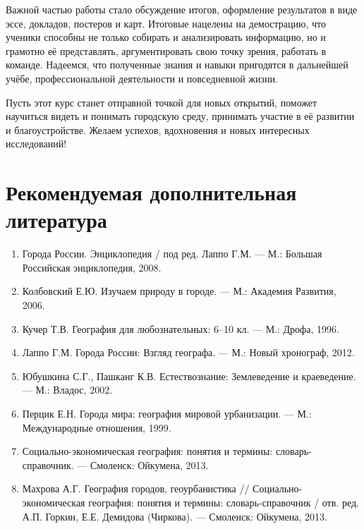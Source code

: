 \documentclass[
  11pt,
]{book}
\providecommand{\tightlist}{%
  \setlength{\itemsep}{0pt}\setlength{\parskip}{0pt}}
\begin{document}
Важной частью работы стало обсуждение итогов, оформление результатов в виде эссе, докладов, постеров и карт. Итоговые нацелены на демострацию, что ученики способны не только собирать и анализировать информацию, но и грамотно её представлять, аргументировать свою точку зрения, работать в команде. Надеемся, что полученные знания и навыки пригодятся в дальнейшей учёбе, профессиональной деятельности и повседневной жизни.

Пусть этот курс станет отправной точкой для новых открытий, поможет научиться видеть и понимать городскую среду, принимать участие в её развитии и благоустройстве.
Желаем успехов, вдохновения и новых интересных исследований!

\chapter{Рекомендуемая дополнительная литература}\label{biblio}

\begin{enumerate}
\def\labelenumi{\arabic{enumi}.}
\tightlist
\item
  Города России. Энциклопедия / под ред. Лаппо Г.М. --- М.: Большая Российская энциклопедия, 2008.
\item
  Колбовский Е.Ю. Изучаем природу в городе. --- М.: Академия Развития, 2006.
\item
  Кучер Т.В. География для любознательных: 6--10 кл. --- М.: Дрофа, 1996.
\item
  Лаппо Г.М. Города России: Взгляд географа. --- М.: Новый хронограф, 2012.
\item
  Юбушкина С.Г., Пашканг К.В. Естествознание: Землеведение и краеведение. --- М.: Владос, 2002.
\item
  Перцик Е.Н. Города мира: география мировой урбанизации. --- М.: Международные отношения, 1999.
\item
  Социально-экономическая география: понятия и термины: словарь-справочник. --- Смоленск: Ойкумена, 2013.
\item
  Махрова А.Г. География городов, геоурбанистика // Социально-экономическая география: понятия и термины: словарь-справочник / отв. ред. А.П. Горкин, Е.Е. Демидова (Чиркова). --- Смоленск: Ойкумена, 2013.
\end{enumerate}
\end{document}
